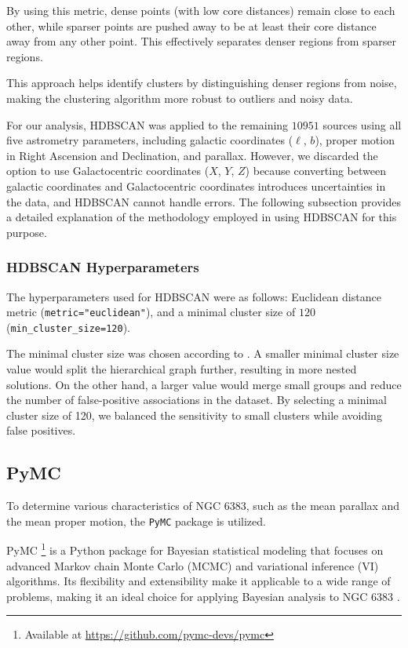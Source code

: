 \documentclass[fleqn,usenatbib,usedcolumn,useAMS]{mnras}
\begin{document}
By using this metric, dense points (with low core distances) remain close to each other, while sparser points are pushed away to be at least their core distance away from any other point. This effectively separates denser regions from sparser regions.

This approach helps identify clusters by distinguishing denser regions from noise, making the clustering algorithm more robust to outliers and noisy data.

For our analysis, HDBSCAN was applied to the remaining $10951$ sources using all five astrometry parameters, including galactic coordinates ($\ell$, $b$), proper motion in Right Ascension and Declination, and parallax. However, we discarded the option to use Galactocentric coordinates ($X$, $Y$, $Z$) because converting between galactic coordinates and Galactocentric coordinates introduces uncertainties in the data, and HDBSCAN cannot handle errors. The following subsection provides a detailed explanation of the methodology employed in using HDBSCAN for this purpose.

\subsubsection{HDBSCAN Hyperparameters}

The hyperparameters used for HDBSCAN were as follows: Euclidean distance metric (\texttt{metric="euclidean"}), and a minimal cluster size of $120$ (\texttt{min\_cluster\_size=120}).

The minimal cluster size was chosen according to \citet{2021A&A...646A.104H}. A smaller minimal cluster size value would split the hierarchical graph further, resulting in more nested solutions. On the other hand, a larger value would merge small groups and reduce the number of false-positive associations in the dataset. By selecting a minimal cluster size of 120, we balanced the sensitivity to small clusters while avoiding false positives.

\subsection{PyMC}

To determine various characteristics of NGC 6383, such as the mean parallax and the mean proper motion, the \texttt{PyMC} package is utilized.

PyMC \footnote{Available at \href{https://github.com/pymc-devs/pymc}{https://github.com/pymc-devs/pymc}} is a Python package for Bayesian statistical modeling that focuses on advanced Markov chain Monte Carlo (MCMC) and variational inference (VI) algorithms. Its flexibility and extensibility make it applicable to a wide range of problems, making it an ideal choice for applying Bayesian analysis to NGC 6383 \citep{Wiecki}.
\end{document}
